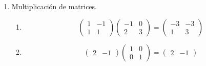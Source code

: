 \documentclass[12pt,letterpaper]{article}
\begin{document}
\begin{enumerate}
\begin{enumerate}
    \item 
    \[
    A+B+C=
    \begin{pmatrix}
    6 & 9 & -1\\
    2 & -5 & 5\\
    -2 & 14 & 3
    \end{pmatrix}
    \]

    \item 
    \[
    3B-2A=
    \begin{pmatrix}
    -8 & 15 & -39\\
    1 & -14 & 1\\
    1 & -18 & -22
    \end{pmatrix}
    \]

    \item 
    \[
3A+2B-4C=
\begin{pmatrix}
-29 & -6 & -8\\
38 & 3 & -7\\
-12 & 7 & -34
\end{pmatrix}
\]

\end{enumerate}


\item Multiplicación de matrices.

\begin{enumerate}
    \item 
    \[
    \begin{pmatrix}
    1 & -1\\
    1 & 1
    \end{pmatrix}
    \begin{pmatrix}
    -1 & 0\\
    2 & 3
    \end{pmatrix}
    =
    \begin{pmatrix}
    -3 & -3\\
    1 & 3
    \end{pmatrix}
    \]

    \item 
    \[
    \begin{pmatrix}
    2 & -1
    \end{pmatrix}
    \begin{pmatrix}
    1 & 0\\
    0 & 1
    \end{pmatrix}
    =
    \begin{pmatrix}
    2 & -1
    \end{pmatrix}
    \]


\end{enumerate}
\end{enumerate}
\end{document}
